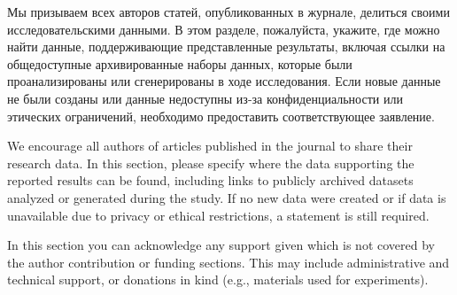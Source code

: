 \documentclass[i-edu.uz,journal,article,submit,pdftex,moreauthors]{Definitions/i-edu.uz}
\begin{document}
\begin{sloppypar}
\dataavailabilityr

{Мы призываем всех авторов статей, опубликованных в журнале, делиться своими исследовательскими данными. В этом разделе, пожалуйста, укажите, где можно найти данные, поддерживающие представленные результаты, включая ссылки на общедоступные архивированные наборы данных, которые были проанализированы или сгенерированы в ходе исследования. Если новые данные не были созданы или данные недоступны из-за конфиденциальности или этических ограничений, необходимо предоставить соответствующее заявление.}

\dataavailability

{We encourage all authors of articles published in the journal to share their research data. In this section, please specify where the data supporting the reported results can be found, including links to publicly archived datasets analyzed or generated during the study. If no new data were created or if data is unavailable due to privacy or ethical restrictions, a statement is still required.}




\acknowledgmentsr

{In this section you can acknowledge any support given which is not covered by the author contribution or funding sections. This may include administrative and technical support, or donations in kind (e.g., materials used for experiments).}


\end{sloppypar}
\end{document}
